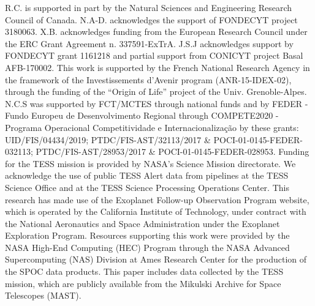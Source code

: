 \documentclass[longauth]{aa}
\begin{document}
\begin{acknowledgements}
  R.C. is supported in part by the Natural Sciences and Engineering Research Council of Canada. 
  N.A-D. acknowledges the support of FONDECYT project 3180063. 
  X.B. acknowledges funding from the European Research Council under the ERC Grant Agreement n. 337591-ExTrA.
  J.S.J acknowledges support by FONDECYT grant 1161218 and partial support from CONICYT project Basal AFB-170002.
  This work is supported by the French National Research Agency in the  framework of the Investissements d’Avenir program (ANR-15-IDEX-02), through the funding of the ``Origin of Life'' project of the Univ. Grenoble-Alpes. 
  N.C.S was supported by FCT/MCTES through national funds and by FEDER - Fundo Europeu de Desenvolvimento Regional through COMPETE2020 - Programa Operacional Competitividade e Internacionalização by these grants: UID/FIS/04434/2019; PTDC/FIS-AST/32113/2017 \& POCI-01-0145-FEDER-032113; PTDC/FIS-AST/28953/2017 \& POCI-01-0145-FEDER-028953.
  Funding for the TESS mission is provided by NASA's Science Mission directorate.
  We acknowledge the use of public TESS Alert data from pipelines at the TESS Science Office and at the TESS Science Processing Operations Center.
  This research has made use of the Exoplanet Follow-up Observation Program website, which is operated by the California Institute of Technology, under contract with the National Aeronautics and Space Administration under the Exoplanet Exploration Program.
  Resources supporting this work were provided by the NASA High-End Computing (HEC) Program through the NASA Advanced Supercomputing (NAS) Division at Ames Research Center for the production of the SPOC data products.
  This paper includes data collected by the TESS mission, which are publicly available from the Mikulski Archive for Space Telescopes (MAST).
\end{acknowledgements}

%
%
\end{document}

